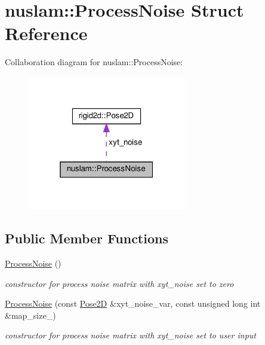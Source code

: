 \hypertarget{structnuslam_1_1ProcessNoise}{}\section{nuslam\+:\+:Process\+Noise Struct Reference}
\label{structnuslam_1_1ProcessNoise}


Collaboration diagram for nuslam\+:\+:Process\+Noise\+:
\nopagebreak
\begin{figure}[H]
\begin{center}
\leavevmode
\includegraphics[width=196pt]{d7/d18/structnuslam_1_1ProcessNoise__coll__graph}
\end{center}
\end{figure}
\subsection*{Public Member Functions}
\begin{DoxyCompactItemize}
\item 
\mbox{\label{structnuslam_1_1ProcessNoise_a9127539d5903305591394d3483d8b74b}} 
\hyperlink{structnuslam_1_1ProcessNoise_a9127539d5903305591394d3483d8b74b}{Process\+Noise} ()
\begin{DoxyCompactList}\small\item\em constructor for process noise matrix with xyt\+\_\+noise set to zero \end{DoxyCompactList}\item 
\mbox{\label{structnuslam_1_1ProcessNoise_accbf7987fa5b945ecae3a11d662ee6e7}} 
\hyperlink{structnuslam_1_1ProcessNoise_accbf7987fa5b945ecae3a11d662ee6e7}{Process\+Noise} (const \hyperlink{structrigid2d_1_1Pose2D}{Pose2D} \&xyt\+\_\+noise\+\_\+var, const unsigned long int \&map\+\_\+size\+\_\+)
\begin{DoxyCompactList}\small\item\em constructor for process noise matrix with xyt\+\_\+noise set to user input \end{DoxyCompactList}\end{DoxyCompactItemize}

